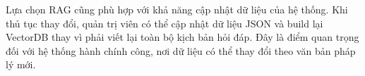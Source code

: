 Lựa chọn RAG cũng phù hợp với khả năng cập nhật dữ liệu của hệ thống.
Khi thủ tục thay đổi, quản trị viên có thể cập nhật dữ liệu JSON và
build lại VectorDB thay vì phải viết lại toàn bộ kịch bản hỏi đáp. Đây
là điểm quan trọng đối với hệ thống hành chính công, nơi dữ liệu có thể
thay đổi theo văn bản pháp lý mới.
